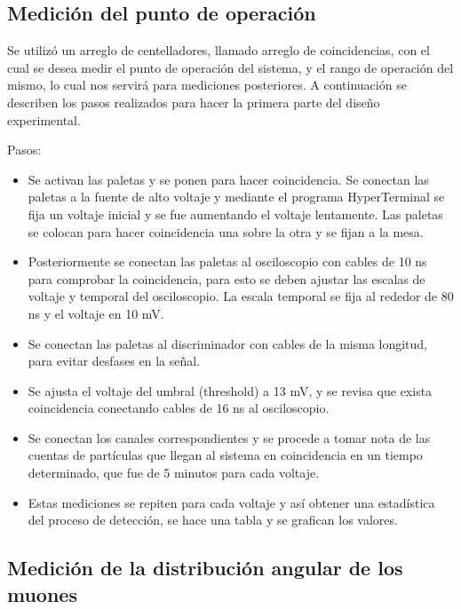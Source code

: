 \documentclass[a4paper,10pt]{article}
\numberwithin{equation}{section}
\begin{document}
\subsection{Medición del punto de operación}

Se utilizó un arreglo de centelladores, llamado arreglo de coincidencias, con el cual se desea medir el punto de operación del sistema, y el rango de operación del mismo, 
lo cual nos servirá para mediciones posteriores. A continuación se describen los 
pasos realizados para hacer la primera parte del diseño experimental.

\vspace{.3cm}

Pasos:

\begin{itemize}
 \item Se activan las paletas y se ponen para hacer coincidencia. Se conectan las paletas a la fuente de alto voltaje y 
 mediante el programa HyperTerminal se fija un voltaje inicial y se fue aumentando el voltaje lentamente. Las paletas 
 se colocan para hacer coincidencia una sobre la otra y se fijan a la mesa.
 \item Posteriormente se conectan las paletas al osciloscopio con cables de 10 ns  para comprobar la coincidencia, para esto se deben ajustar 
 las escalas de voltaje y temporal del osciloscopio. La escala temporal se fija al rededor de 80 ns y 
 el voltaje en 10 mV.
 \item Se conectan las paletas al discriminador con cables de la misma longitud, para evitar desfases en la señal.
 \item Se ajusta el voltaje del umbral (threshold) a 13 mV, y se revisa que exista coincidencia conectando cables de 
 16 ns al osciloscopio.
 \item Se conectan los canales correspondientes y se procede a tomar nota de las cuentas de partículas que llegan al sistema
 en coincidencia en un tiempo determinado, que fue de 5 minutos para cada voltaje.
 \item Estas mediciones se repiten para cada voltaje y así obtener una estadística del proceso de detección, se hace una tabla y 
 se grafican los valores.
\end{itemize}


\subsection{Medición de la distribución angular de los muones}
\end{document}
